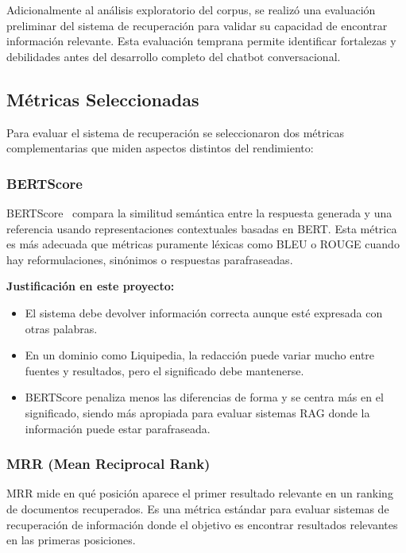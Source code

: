Adicionalmente al análisis exploratorio del corpus, se realizó una evaluación preliminar del sistema de recuperación para validar su capacidad de encontrar información relevante. Esta evaluación temprana permite identificar fortalezas y debilidades antes del desarrollo completo del chatbot conversacional.

\subsection{Métricas Seleccionadas}

Para evaluar el sistema de recuperación se seleccionaron dos métricas complementarias que miden aspectos distintos del rendimiento:

\subsubsection{BERTScore}

BERTScore~\cite{zhang2019bertscore} compara la similitud semántica entre la respuesta generada y una referencia usando representaciones contextuales basadas en BERT. Esta métrica es más adecuada que métricas puramente léxicas como BLEU o ROUGE cuando hay reformulaciones, sinónimos o respuestas parafraseadas.

\textbf{Justificación en este proyecto:}
\begin{itemize}
    \item El sistema debe devolver información correcta aunque esté expresada con otras palabras.
    \item En un dominio como Liquipedia, la redacción puede variar mucho entre fuentes y resultados, pero el significado debe mantenerse.
    \item BERTScore penaliza menos las diferencias de forma y se centra más en el significado, siendo más apropiada para evaluar sistemas RAG donde la información puede estar parafraseada.
\end{itemize}

\subsubsection{MRR (Mean Reciprocal Rank)}

MRR mide en qué posición aparece el primer resultado relevante en un ranking de documentos recuperados. Es una métrica estándar para evaluar sistemas de recuperación de información donde el objetivo es encontrar resultados relevantes en las primeras posiciones.

